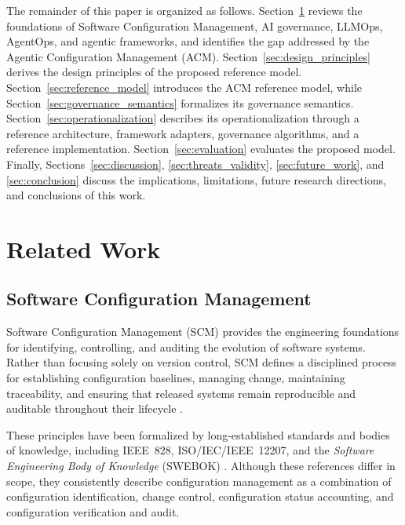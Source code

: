 \documentclass[10pt]{article}
\begin{document}
The remainder of this paper is organized as follows. Section~\ref{sec:related_work} reviews the foundations of Software Configuration Management, AI governance, LLMOps, AgentOps, and agentic frameworks, and identifies the gap addressed by the Agentic Configuration Management (ACM). Section~\ref{sec:design_principles} derives the design principles of the proposed reference model. Section~\ref{sec:reference_model} introduces the ACM reference model, while Section~\ref{sec:governance_semantics} formalizes its governance semantics. Section~\ref{sec:operationalization} describes its operationalization through a reference architecture, framework adapters, governance algorithms, and a reference implementation. Section~\ref{sec:evaluation} evaluates the proposed model. Finally, Sections~\ref{sec:discussion}, \ref{sec:threats_validity}, \ref{sec:future_work}, and \ref{sec:conclusion} discuss the implications, limitations, future research directions, and conclusions of this work.

\section{Related Work}
\label{sec:related_work}

\subsection{Software Configuration Management}
\label{sec:scm}

Software Configuration Management (SCM) provides the engineering foundations for identifying, controlling, and auditing the evolution of software systems. Rather than focusing solely on version control, SCM defines a disciplined process for establishing configuration baselines, managing change, maintaining traceability, and ensuring that released systems remain reproducible and auditable throughout their lifecycle \cite{whitgift1991methods, conradi1998version, leon2015software, bersoff1984elements, bersoff1978software}.

These principles have been formalized by long-established standards and bodies of knowledge, including IEEE~828, ISO/IEC/IEEE~12207, and the \emph{Software Engineering Body of Knowledge} (SWEBOK) \cite{swebok40, ieee2012ieee, wohlinsnowballing}. Although these references differ in scope, they consistently describe configuration management as a combination of configuration identification, change control, configuration status accounting, and configuration verification and audit.
\end{document}
